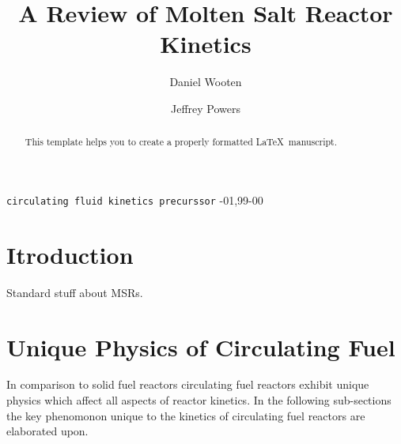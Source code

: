 \documentclass[review]{elsarticle}
\begin{document}
\begin{frontmatter}

\title{A Review of Molten Salt Reactor Kinetics}

\author{Daniel Wooten}
\address{4155 Etcheverry Hall, MC 1730, University of California, Berkeley,
    Berkeley, CA 94720-1730}

\author{Jeffrey Powers}
\address{Oak Ridge}

\begin{abstract}
This template helps you to create a properly formatted \LaTeX\ manuscript.
\end{abstract}

\begin{keyword}
\texttt{circulating fluid kinetics precurssor}
-01\sep  99-00
\end{keyword}

\end{frontmatter}

\linenumbers

\section{Itroduction} \label{introduction}
Standard stuff about MSRs.

\section{Unique Physics of Circulating Fuel} 
In comparison to solid fuel reactors circulating fuel reactors exhibit unique
physics which affect all aspects of reactor kinetics. In the following
sub-sections the key phenomonon unique to the kinetics of circulating fuel
reactors are elaborated upon.
\end{document}

